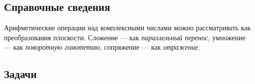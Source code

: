 \subsection*{Справочные сведения}


Арифметические операции над комплексными числами можно рассматривать как преобразования плоскости. Сложение --- как \textit{параллельный перенос}, умножение --- как \textit{поворотную гомотетию}, сопряжение --- как \textit{отражение}.


\subsection*{Задачи}


